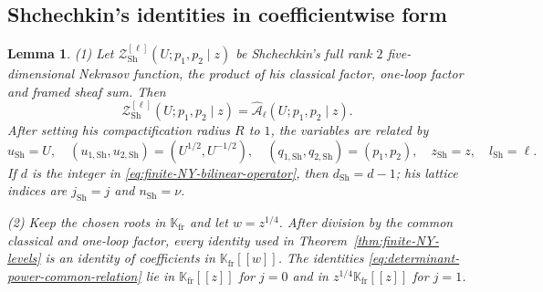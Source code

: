 \documentclass{amsart}
\newtheorem{lemma}{Lemma}
\theoremstyle{definition}
\numberwithin{equation}{section}
\newcommand{\K}{\mathbb K}
\begin{document}
\subsection{Shchechkin's identities in coefficientwise form}
\begin{lemma}
\label{lem:Shchechkin}
\textup{(1)} Let \(\mathcal Z_{\mathrm{Sh}}^{[\ell]}(U;p_1,p_2\mid z)\) be Shchechkin's full rank \(2\) five-dimensional Nekrasov function, the product of his classical factor, one-loop factor and framed sheaf sum.  Then
\begin{equation}
 \mathcal Z_{\mathrm{Sh}}^{[\ell]}(U;p_1,p_2\mid z)
 =\widehat{\mathcal A}_\ell(U;p_1,p_2\mid z).
\label{eq:Shchechkin-full-function-identification}
\end{equation}
After setting his compactification radius \(R\) to \(1\), the variables are related by
\begin{equation}
 u_{\mathrm{Sh}}=U,\quad
 (u_{1,\mathrm{Sh}},u_{2,\mathrm{Sh}})=(U^{1/2},U^{-1/2}),\quad
 (q_{1,\mathrm{Sh}},q_{2,\mathrm{Sh}})=(p_1,p_2),\quad
 z_{\mathrm{Sh}}=z,\quad l_{\mathrm{Sh}}=\ell.
\label{eq:Shchechkin-variable-map}
\end{equation}
If \(d\) is the integer in \eqref{eq:finite-NY-bilinear-operator}, then \(d_{\mathrm{Sh}}=d-1\); his lattice indices are \(j_{\mathrm{Sh}}=j\) and \(n_{\mathrm{Sh}}=\nu\).

\textup{(2)} Keep the chosen roots in \(\K_{\mathrm{fr}}\) and let \(w=z^{1/4}\).  After division by the common classical and one-loop factor, every identity used in Theorem~\ref{thm:finite-NY-levels} is an identity of coefficients in \(\K_{\mathrm{fr}}[[w]]\).  The identities \eqref{eq:determinant-power-common-relation} lie in \(\K_{\mathrm{fr}}[[z]]\) for \(j=0\) and in \(z^{1/4}\K_{\mathrm{fr}}[[z]]\) for \(j=1\).
\end{lemma}
\end{document}
